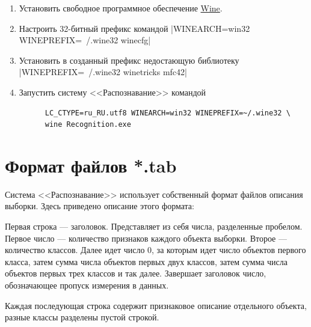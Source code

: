 \documentclass[12pt]{article}
\begin{document}
\begin{enumerate}
  \item Установить свободное программное обеспечение
    \href{https://www.winehq.org/}{Wine}.
  \item Настроить 32-битный префикс командой
    |WINEARCH=win32 WINEPREFIX=~/.wine32 winecfg|
  \item Установить в созданный префикс недостающую библиотеку
    |WINEPREFIX=~/.wine32 winetricks mfc42|
  \item Запустить систему <<Распознавание>> командой
    \begin{verbatim}
      LC_CTYPE=ru_RU.utf8 WINEARCH=win32 WINEPREFIX=~/.wine32 \
      wine Recognition.exe
    \end{verbatim}
\end{enumerate}

\section{Формат файлов *.tab}

Система <<Распознавание>> \cite{recognition06} использует собственный
формат файлов описания выборки. Здесь приведено описание этого
формата:

Первая строка --- заголовок. Представляет из себя числа, разделенные
пробелом. Первое число --- количество признаков каждого объекта
выборки. Второе --- количество классов. Далее идет число \(0\), за
которым идет число объектов первого класса, затем сумма числа объектов
первых двух классов, затем сумма числа объектов первых трех классов и
так далее. Завершает заголовок число, обозначающее пропуск измерения в
данных.

Каждая последующая строка содержит признаковое описание отдельного
объекта, разные классы разделены пустой строкой.

\printbibliography
\end{document}
